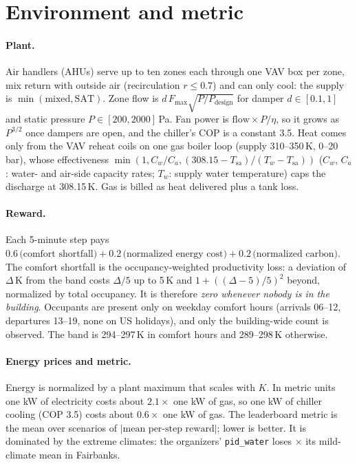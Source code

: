 \documentclass{article}
\begin{document}
\section{Environment and metric}
\label{sec:env}

\paragraph{Plant.} Air handlers (AHUs) serve up to ten zones each through one VAV box per zone, mix return with outside air (recirculation $r\le 0.7$) and can only cool: the supply is $\min(\text{mixed}, \text{SAT})$. Zone flow is $d\,F_{\max}\sqrt{P/P_{\text{design}}}$ for damper $d\in[0.1,1]$ and static pressure $P\in[200,2000]$\,Pa. Fan power is $\text{flow}\times P/\eta$, so it grows as $P^{3/2}$ once dampers are open, and the chiller's COP is a constant 3.5. Heat comes only from the VAV reheat coils on one gas boiler loop (supply 310--350\,K, 0--20\,bar), whose effectiveness $\min(1, C_w/C_a, (308.15-T_{\text{sa}})/(T_w - T_{\text{sa}}))$ ($C_w$, $C_a$: water- and air-side capacity rates; $T_w$: supply water temperature) caps the discharge at 308.15\,K. Gas is billed as heat delivered plus a tank loss.

\paragraph{Reward.} Each 5-minute step pays $0.6\,\text{(comfort shortfall)} + 0.2\,\text{(normalized energy cost)} + 0.2\,\text{(normalized carbon)}$. The comfort shortfall is the occupancy-weighted productivity loss: a deviation of $\Delta$\,K from the band costs $\Delta/5$ up to 5\,K and $1+((\Delta-5)/5)^2$ beyond, normalized by total occupancy. It is therefore \emph{zero whenever nobody is in the building}. Occupants are present only on weekday comfort hours (arrivals 06--12, departures 13--19, none on US holidays), and only the building-wide count is observed. The band is 294--297\,K in comfort hours and 289--298\,K otherwise.

\paragraph{Energy prices and metric.} Energy is normalized by a plant maximum that scales with $K$. In metric units one kW of electricity costs about $2.1\times$ one kW of gas, so one kW of chiller cooling (COP 3.5) costs about $0.6\times$ one kW of gas. The leaderboard metric is the mean over scenarios of $|\text{mean per-step reward}|$; lower is better. It is dominated by the extreme climates: the organizers' \texttt{pid\_water} loses \ExtremeRatioFairbanks$\times$ its mild-climate mean in Fairbanks.
\end{document}
